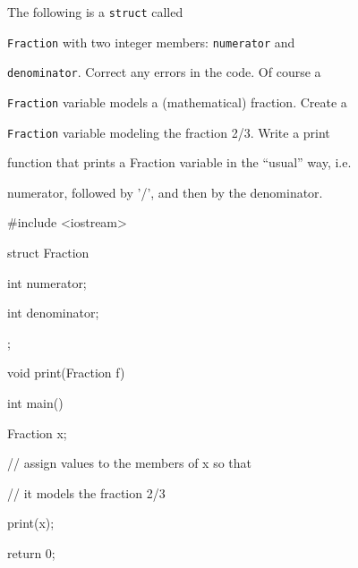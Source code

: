 The following is a \texttt{struct} called

\texttt{Fraction} with two integer members: \texttt{numerator} and

\texttt{denominator}. Correct any errors in the code. Of course a

\texttt{Fraction} variable models a (mathematical) fraction. Create a

\texttt{Fraction} variable modeling the fraction 2/3. Write a print

function that prints a Fraction variable in the ``usual'' way, i.e.

numerator, followed by '/', and then by the denominator.



\begin{consolethree}[escapeinside=||]

#include <iostream>



struct Fraction

{

    int numerator;

    int denominator;

};



void print(Fraction f)

{

}



int main()

{

    Fraction x;

    // assign values to the members of x so that

    // it models the fraction 2/3

    print(x);

    return 0;

}

\end{consolethree}

